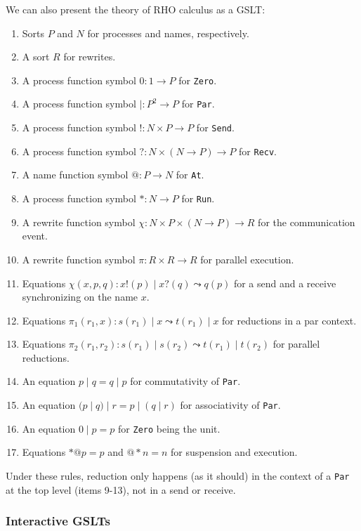 \documentclass{article}
\begin{document}
We can also present the theory of RHO calculus as a GSLT:
\begin{enumerate}
    \item Sorts $P$ and $N$ for processes and names, respectively.
    \item A sort $R$ for rewrites.
    \item A process function symbol $0\colon 1 \to P$ for \verb+Zero+.
    \item A process function symbol $|\colon P^2 \to P$ for \verb+Par+.
    \item A process function symbol $!\colon N \times P \to P$ for \verb+Send+.
    \item A process function symbol $?\colon N \times (N \to P) \to P$ for \verb+Recv+.
    \item A name function symbol $@\colon P \to N$ for \verb+At+.
    \item A process function symbol $*\colon N \to P$ for \verb+Run+.
    \item A rewrite function symbol $\chi\colon N \times P \times (N \to P) \to R$ for the communication event.
    \item A rewrite function symbol $\pi\colon R \times R \to R$ for parallel execution.
    \item Equations $\chi(x, p, q)\colon x!(p)\;| \; x?(q) \leadsto q(p)$ for a send and a receive synchronizing on the name $x.$
    \item Equations $\pi_1(r_1, x)\colon s(r_1)\;|\;x \leadsto t(r_1)\; |\; x$ for reductions in a par context.
    \item Equations $\pi_2(r_1, r_2)\colon s(r_1)\;|\;s(r_2) \leadsto t(r_1)\; |\; t(r_2)$ for parallel reductions.
    \item An equation $p\; |\; q = q\; |\; p$ for commutativity of \verb+Par+.
    \item An equation $(p\; |\; q)\; |\; r = p\; |\; (q\; |\; r)$ for associativity of \verb+Par+.
    \item An equation $0 \; |\; p = p$ for \verb+Zero+ being the unit.
    \item Equations $*@p = p$ and $@*n = n$ for suspension and execution.
\end{enumerate}
Under these rules, reduction only happens (as it should) in the context of a \verb+Par+ at the top level (items 9-13), not in a send or receive.

\subsubsection{Interactive GSLTs}
\end{document}
